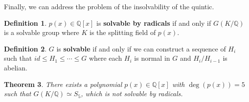 \documentclass[11pt]{amsart}
\newtheorem{theorem}{Theorem}[section]
\theoremstyle{definition}
\newtheorem{definition}[theorem]{Definition}
\newcommand{\rationals}{\mathbb{Q}}
\begin{document}
Finally, we can address the problem of the insolvability of the quintic.
\begin{definition}
	$p(x) \in \rationals[x]$ is \textbf{solvable by radicals} if and only if $G(K/\rationals)$ is a solvable group where $K$ is the splitting field of
	$p(x)$.
\end{definition}
\begin{definition}
	$G$ is \textbf{solvable} if and only if we can construct a sequence of $H_i$ such that $id \leq H_1 \leq \cdots \leq G$ where each $H_i$
	is normal in $G$ and $H_i/H_{i-1}$ is abelian.
\end{definition}
\begin{theorem}
	There exists a polynomial $p(x) \in \rationals[x]$ with $\deg(p(x)) = 5$ such that $G(K/\rationals) \simeq S_5$, which is not solvable by
	radicals.
\end{theorem}
	
\end{document}
